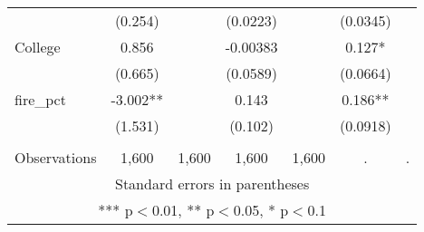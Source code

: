\begin{tabular}{lcccccc}
 & (0.254) &  & (0.0223) &  & (0.0345) &  \\
College & 0.856 &  & -0.00383 &  & 0.127* &  \\
 & (0.665) &  & (0.0589) &  & (0.0664) &  \\
fire\_pct & -3.002** &  & 0.143 &  & 0.186** &  \\
 & (1.531) &  & (0.102) &  & (0.0918) &  \\
 &  &  &  &  &  &  \\
 Observations & 1,600 & 1,600 & 1,600 & 1,600 & . & . \\ \hline
\multicolumn{7}{c}{ Standard errors in parentheses} \\
\multicolumn{7}{c}{ *** p$<$0.01, ** p$<$0.05, * p$<$0.1} \\
\end{tabular}
